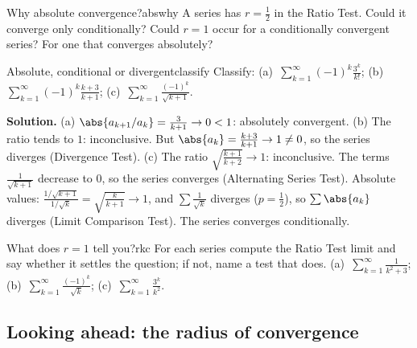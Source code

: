 \documentclass[11pt]{article}
\begin{document}
\begin{think}{Why absolute convergence?}{abswhy}
A series has $r=\frac12$ in the Ratio Test. Could it converge only conditionally? Could $r=1$ occur for a conditionally convergent series? For one that converges absolutely?
\end{think}

\begin{exmp}{Absolute, conditional or divergent}{classify}
Classify: (a)~$\displaystyle\sum_{k=1}^\infty(-1)^k\frac{3^k}{k!}$; \quad (b)~$\displaystyle\sum_{k=1}^\infty(-1)^k\frac{k+3}{k+1}$; \quad (c)~$\displaystyle\sum_{k=1}^\infty\frac{(-1)^k}{\sqrt{k+1}}$.

\textbf{Solution.} (a) $\abs{a_{k+1}/a_k}=\frac3{k+1}\to0<1$: absolutely convergent. (b) The ratio tends to $1$: inconclusive. But $\abs{a_k}=\frac{k+3}{k+1}\to1\ne0$, so the series diverges (Divergence Test). (c) The ratio $\sqrt{\frac{k+1}{k+2}}\to1$: inconclusive. The terms $\frac1{\sqrt{k+1}}$ decrease to $0$, so the series converges (Alternating Series Test). Absolute values: $\frac{1/\sqrt{k+1}}{1/\sqrt k}=\sqrt{\frac k{k+1}}\to1$, and $\sum\frac1{\sqrt k}$ diverges ($p=\frac12$), so $\sum\abs{a_k}$ diverges (Limit Comparison Test). The series converges conditionally.
\end{exmp}

\begin{kc}{What does $r=1$ tell you?}{rkc}
For each series compute the Ratio Test limit and say whether it settles the question; if not, name a test that does. (a)~$\displaystyle\sum_{k=1}^\infty\frac1{k^2+3}$; \quad (b)~$\displaystyle\sum_{k=1}^\infty\frac{(-1)^k}{\sqrt k}$; \quad (c)~$\displaystyle\sum_{k=1}^\infty\frac{3^k}{k^2}$.
\end{kc}

\subsection*{Looking ahead: the radius of convergence}
\end{document}
